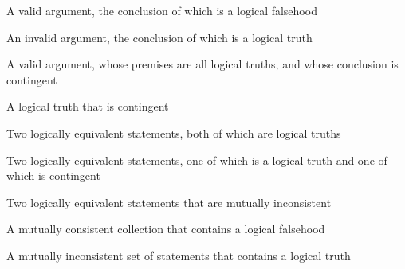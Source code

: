 \documentclass[PHIL101-Textbook.tex]{subfiles}
\begin{document}
\begin{earg}
\item A valid argument, the conclusion of which is a logical falsehood

\item An invalid argument, the conclusion of which is a logical truth

\item A valid argument, whose premises are all logical truths, and whose conclusion is contingent

\item A logical truth that is contingent

\item Two logically equivalent statements, both of which are logical truths

\item Two logically equivalent statements, one of which is a logical truth and one of which is contingent

\item Two logically equivalent statements that are mutually inconsistent

\item A mutually consistent collection that contains a logical falsehood

\item A mutually inconsistent set of statements that contains a logical truth
\end{earg}
\end{document}
